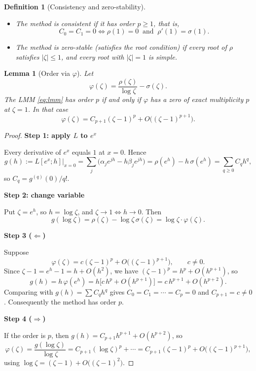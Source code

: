 \documentclass[11pt,a4paper]{article}
\numberwithin{equation}{section}
\theoremstyle{spacedplain}
\newtheorem{lemma}[theorem]{Lemma}
\theoremstyle{spaceddefinition}
\newtheorem{definition}[theorem]{Definition}
\theoremstyle{spacedremark}
\newcommand{\step}[1]{\par\addvspace{0.6em}\noindent\textbf{#1}\par\nobreak}
\begin{document}
\begin{definition}[Consistency and zero-stability]
\leavevmode
\begin{itemize}
  \item The method is \emph{consistent} if it has order \(p\ge1\),
    that is,
    \[
      C_0=C_1=0
      \iff
      \rho(1)=0\ \text{ and }\ \rho'(1)=\sigma(1).
    \]
  \item The method is \emph{zero-stable} (satisfies the \emph{root
    condition}) if every root of \(\rho\) satisfies
    \(|\zeta|\le1\), and every root with \(|\zeta|=1\) is simple.
\end{itemize}
\end{definition}

\begin{keybox}
\begin{lemma}[Order via \(\varphi\)]\label{lem:order}
Let
\[
  \varphi(\zeta)=\frac{\rho(\zeta)}{\log\zeta}-\sigma(\zeta).
\]
The LMM \eqref{eq:lmm} has order \(p\) if and only if \(\varphi\) has a
zero of exact multiplicity \(p\) at \(\zeta=1\).  In that case
\[
  \varphi(\zeta)=C_{p+1}(\zeta-1)^p+O\bigl((\zeta-1)^{p+1}\bigr).
\]
\end{lemma}
\end{keybox}

\begin{proof}\leavevmode
\step{Step 1: apply \(L\) to \(e^x\)}
Every derivative of \(e^x\)
equals \(1\) at \(x=0\).  Hence
\[
  g(h):=L[e^x;h]\big|_{x=0}
  =\sum_j\bigl(\alpha_je^{jh}-h\beta_je^{jh}\bigr)
  =\rho(e^h)-h\,\sigma(e^h)
  =\sum_{q\ge0}C_qh^q ,
\]
so \(C_q=g^{(q)}(0)/q!\).

\step{Step 2: change variable}
Put \(\zeta=e^h\), so
\(h=\log\zeta\), and \(\zeta\to1\iff h\to0\).  Then
\[
  g(\log\zeta)
  =\rho(\zeta)-\log\zeta\,\sigma(\zeta)
  =\log\zeta\cdot\varphi(\zeta).
\]

\step{Step 3 (\(\Leftarrow\))}
Suppose
\[
  \varphi(\zeta)=c(\zeta-1)^p+O\bigl((\zeta-1)^{p+1}\bigr),
  \qquad c\ne0.
\]
Since \(\zeta-1=e^h-1=h+O(h^2)\), we have
\((\zeta-1)^p=h^p+O(h^{p+1})\), so
\[
  g(h)=h\,\varphi(e^h)
  =h\bigl[c\,h^p+O(h^{p+1})\bigr]
  =c\,h^{p+1}+O(h^{p+2}).
\]
Comparing with \(g(h)=\sum C_qh^q\) gives
\(C_0=C_1=\cdots=C_p=0\) and \(C_{p+1}=c\ne0\).  Consequently the
method has order \(p\).

\step{Step 4 (\(\Rightarrow\))}
If the order is \(p\), then
\(g(h)=C_{p+1}h^{p+1}+O(h^{p+2})\), so
\[
  \varphi(\zeta)
  =\frac{g(\log\zeta)}{\log\zeta}
  =C_{p+1}(\log\zeta)^p+\cdots
  =C_{p+1}(\zeta-1)^p+O\bigl((\zeta-1)^{p+1}\bigr),
\]
using \(\log\zeta=(\zeta-1)+O\bigl((\zeta-1)^2\bigr)\).
\end{proof}
\end{document}
